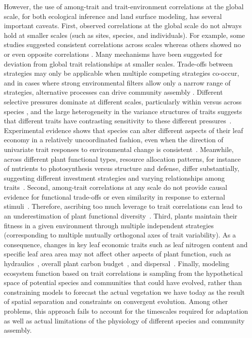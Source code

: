 However, the use of among-trait and trait-environment correlations at the global scale, for both ecological inference and land surface modeling, has several important caveats.
First, observed correlations at the global scale do not always hold at smaller scales (such as sites, species, and individuals).
For example, some studies suggested consistent correlations across scales%
\cite{wright_worldwide_2004,albert_multi-trait_2010,asner_amazonian_2014}
whereas others showed no or even opposite correlations%
\cite{albert_intraspecific_2010,messier_how_2010,wright_does_2012,feng_scale_2013,grubb_relationships_2015,wigley_leaf_2016,messier_traitnetwork,kichenin_2013_contrasting}.
Many mechanisms have been suggested for deviation from global trait relationships at smaller scales.
Trade-offs between strategies may only be applicable when multiple competing strategies co-occur, and in cases where strong environmental filters allow only a narrow range of strategies, alternative processes can drive community assembly%
\cite{rosado_trait_dominance,pierce_csr_cooccur,grim_pierce_book}.
Different selective pressures dominate at different scales, particularly within versus across species%
\cite{albert_intraspecific_2010,messier_how_2010,kichenin_2013_contrasting},
and the large heterogeneity in the variance structures of traits suggests that different traits have contrasting sensitivity to these different pressures~\cite{messier_trait_2016}.
Experimental evidence shows that species can alter different aspects of their leaf economy in a relatively uncoordinated fashion, even when the direction of univariate trait responses to environmental change is consistent~\cite{wright_does_2012}.
Meanwhile, across different plant functional types, resource allocation patterns, for instance of nutrients to photosynthesis versus structure and defense, differ substantially, suggesting different investment strategies and varying relationships among traits~\cite{ghimire_2017_Nallocation}.
Second, among-trait correlations at any scale do not provide causal evidence for functional trade-offs or even similarity in response to external stimuli~\cite{messier_trait_2016}.
Therefore, ascribing too much leverage to trait correlations can lead to an underestimation of plant functional diversity~\cite{grubb_trade-offs_2015}.
Third, plants maintain their fitness in a given environment through multiple independent strategies (corresponding to multiple mutually orthogonal axes of trait variability).
As a consequence, changes in key leaf economic traits such as leaf nitrogen content and specific leaf area area may not affect other aspects of plant function, such as
hydraulics~\cite{li_leaf_2015},
overall plant carbon budget~\cite{edwards_leaf_2014},
and dispersal~\cite{westoby_plant_2002}.
Finally, modeling ecosystem function based on trait correlations is sampling from the hypothetical space of potential species and communities that could have evolved, rather than constraining models to forecast the actual vegetation we have today as the result of spatial separation and constraints on convergent evolution.
Among other problems, this approach fails to account for the timescales required for adaptation as well as actual limitations of the physiology of different species and community assembly.

